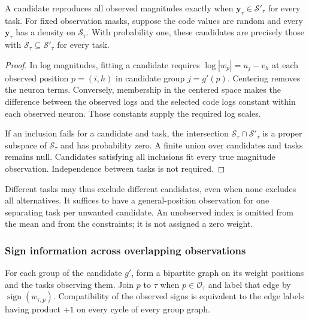 \begin{proposition}
    \label{prop:theory-observed-masks}
    A candidate reproduces all observed magnitudes exactly when
    $\mathbf y_\tau\in\mathcal S'_\tau$
    for every task.
    For fixed observation masks, suppose the code values are random
    and every $\mathbf y_\tau$ has a density on
    $\mathcal S_\tau$.
    With probability one, these candidates are precisely those with
    $\mathcal S_\tau
        \subseteq\mathcal S'_\tau$ for every task.
\end{proposition}

\begin{proof}
    In log magnitudes, fitting a candidate requires
    $\log|w_p|=u_j-v_h$ at each observed position $p=(i,h)$
    in candidate group $j=g'(p)$. Centering removes the neuron terms.
    Conversely, membership in the centered space makes the
    difference between the observed logs and the selected code
    logs constant within each observed neuron. Those constants
    supply the required log scales.

    If an inclusion fails for a candidate and task, the intersection
    $\mathcal S_\tau
        \cap\mathcal S'_\tau$ is a proper subspace
    of $\mathcal S_\tau$ and has probability zero.
    A finite union over candidates and tasks remains null.
    Candidates satisfying all inclusions fit every true magnitude
    observation. Independence between tasks is not required.
\end{proof}

Different tasks may thus exclude different candidates, even when
none excludes all alternatives. It suffices to have a general-position
observation for one separating task per unwanted candidate.
An unobserved index is omitted from the mean and from the
constraints; it is not assigned a zero weight.

\subsubsection{Sign information across overlapping observations}
\label{app:theory-partial-signs}

For each group of the candidate $g'$, form a bipartite graph on its
weight positions and the tasks observing them. Join $p$ to $\tau$
when $p\in\mathcal O_\tau$ and label that edge by
$\operatorname{sign}(w_{\tau,p})$. Compatibility of the observed
signs is equivalent to the edge labels having product $+1$ on every
cycle of every group graph.

